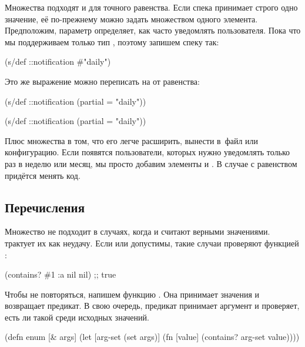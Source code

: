 Множества подходят и для точного равенства. Если спека принимает строго одно
значение, её по-прежнему можно задать множеством одного
элемента. Предположим, параметр  определяет, как часто уведомлять
пользователя. Пока что мы поддерживаем только тип , поэтому
запишем спеку так:


\begin{clojure}
(s/def ::notification #{"daily"})
\end{clojure}


\noindent
Это же выражение можно переписать на  от равенства:

\ifnarrow


\begin{clojure}
(s/def ::notification
  (partial = "daily"))
\end{clojure}


\else


\begin{clojure}
(s/def ::notification (partial = "daily"))
\end{clojure}


\fi

Плюс множества в том, что его легче расширить, вынести в~файл или
конфигурацию. Если появятся пользователи, которых нужно уведомлять только раз в
неделю или месяц, мы просто добавим элементы  и . В
случае с равенством придётся менять код.

\subsection{Перечисления}


Множество не подходит в случаях, когда  и  считают верными
значениями.  трактует их как неудачу. Если  или
 допустимы, такие случаи проверяют функцией :


\begin{clojure}
(contains? #{1 :a nil} nil) ;; true
\end{clojure}


Чтобы не повторяться, напишем функцию . Она принимает значения и
возвращает предикат. В свою очередь, предикат принимает аргумент и проверяет,
есть ли такой среди исходных значений.


\begin{clojure}
(defn enum [& args]
  (let [arg-set (set args)]
    (fn [value]
      (contains? arg-set value))))
\end{clojure}


